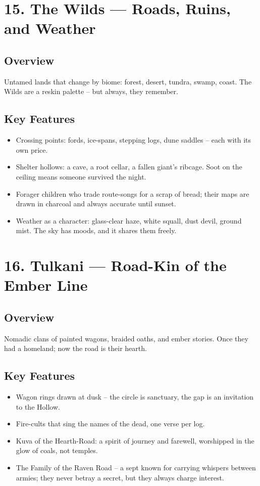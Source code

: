 \documentclass[11pt]{article}
\begin{document}
\section*{15. The Wilds --- Roads, Ruins, and Weather}

\subsection*{Overview}
Untamed lands that change by biome: forest, desert, tundra, swamp, coast. The Wilds are a reskin palette -- but always, they remember.

\subsection*{Key Features}
\begin{itemize}[leftmargin=*]
    \item Crossing points: fords, ice-spans, stepping logs, dune saddles -- each with its own price.
    \item Shelter hollows: a cave, a root cellar, a fallen giant's ribcage. Soot on the ceiling means someone survived the night.
    \item Forager children who trade route-songs for a scrap of bread; their maps are drawn in charcoal and always accurate until sunset.
    \item Weather as a character: glass-clear haze, white squall, dust devil, ground mist. The sky has moods, and it shares them freely.
\end{itemize}

\section*{16. Tulkani --- Road-Kin of the Ember Line}

\subsection*{Overview}
Nomadic clans of painted wagons, braided oaths, and ember stories. Once they had a homeland; now the road is their hearth.

\subsection*{Key Features}
\begin{itemize}[leftmargin=*]
    \item Wagon rings drawn at dusk -- the circle is sanctuary, the gap is an invitation to the Hollow.
    \item Fire-cults that sing the names of the dead, one verse per log.
    \item Kuva of the Hearth-Road: a spirit of journey and farewell, worshipped in the glow of coals, not temples.
    \item The Family of the Raven Road -- a sept known for carrying whispers between armies; they never betray a secret, but they always charge interest.
\end{itemize}
\end{document}
